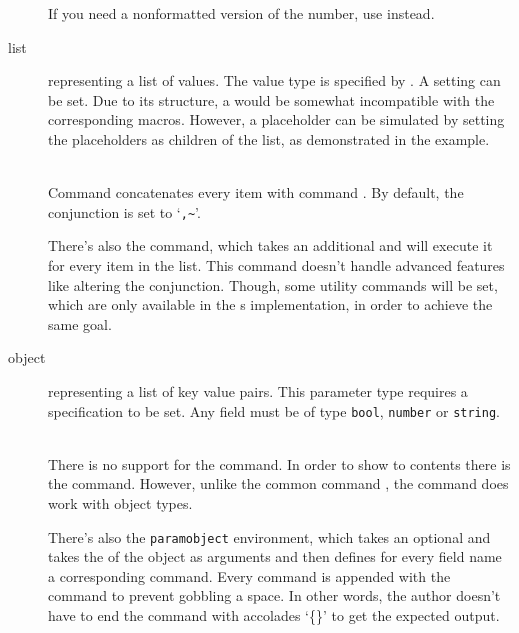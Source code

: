 \documentclass{ltxdoc}
\newcommand\showexample[5][15pt]{%
\begin{minipage}[t]{.5\linewidth - .5 \columnsep}%

\end{minipage}\hspace*{\columnsep}%
\begin{minipage}[t]{.5\linewidth - .5 \columnsep}%

\end{minipage}\\%
}
\begin{document}
\begin{description}
        If you need a nonformatted version of the number, use \cmd{\rawparam} instead.
        \item[list] representing a list of values.
        The value type is specified by .
        A  setting can be set.
        Due to its structure, a  would be somewhat incompatible with the corresponding macros.
        However, a placeholder can be simulated by setting the placeholders as children of the  list, as demonstrated in the example.\\
        \showexample{10}{10-15}{4}{4-6}
        \DescribeMacro{\param}
        Command \cmd{\param} concatenates every item with command \cmd{\paramlistconjunction}.
        \DescribeMacro{\paramlistconjunction}
        By default, the conjunction is set to `\texttt{,\textasciitilde}'.

        \DescribeMacro{\forlistitem}
        There's also the \cmd{\forlistitem} command, which takes an additional  and will execute it for every item in the list.
        This command doesn't handle advanced features like altering the conjunction.
        Though, some utility commands will be set, which are only available in the s implementation, in order to achieve the same goal.
        \item[object] representing a list of key value pairs.
        This parameter type requires a  specification to be set.
        Any field must be of type \texttt{bool}, \texttt{number} or \texttt{string}.\\
        \showexample{16}{16-27}{7}{7-10}
        There is no support for the \cmd{\param} command.
        \DescribeMacro{\paramfield}
        In order to show to contents there is the \cmd{\paramfield} command.
        However, unlike the common command \cmd{\param}, the command \cmd{\hasparam} does work with object types.

         There's also the \texttt{paramobject} environment, which takes an optional  and takes the  of the object as arguments and then defines for every field name a corresponding command.
        Every command is appended with the \cmd{\xspace} command to prevent gobbling a space.
        In other words, the author doesn't have to end the command with accolades `\{\}' to get the expected output.


\end{description}
\end{document}
